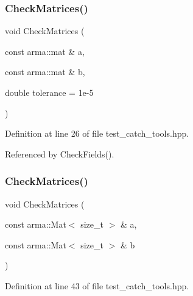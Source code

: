 \subsubsection{Check\+Matrices()\hspace{0.1cm}{\footnotesize\ttfamily [1/3]}}
{\footnotesize\ttfamily void Check\+Matrices (\begin{DoxyParamCaption}\item[{const arma\+::mat \&}]{a,  }\item[{const arma\+::mat \&}]{b,  }\item[{double}]{tolerance = {\ttfamily 1e-\/5} }\end{DoxyParamCaption})\hspace{0.3cm}{\ttfamily [inline]}}



Definition at line 26 of file test\+\_\+catch\+\_\+tools.\+hpp.



Referenced by Check\+Fields().

\mbox{\label{test__catch__tools_8hpp_a55e4e6a1b90fa29f377545ada95d9c13}} 
\subsubsection{Check\+Matrices()\hspace{0.1cm}{\footnotesize\ttfamily [2/3]}}
{\footnotesize\ttfamily void Check\+Matrices (\begin{DoxyParamCaption}\item[{const arma\+::\+Mat$<$ size\+\_\+t $>$ \&}]{a,  }\item[{const arma\+::\+Mat$<$ size\+\_\+t $>$ \&}]{b }\end{DoxyParamCaption})\hspace{0.3cm}{\ttfamily [inline]}}



Definition at line 43 of file test\+\_\+catch\+\_\+tools.\+hpp.

\mbox{\label{test__catch__tools_8hpp_afe966f828dc9f987f9f46f348947a729}} 
